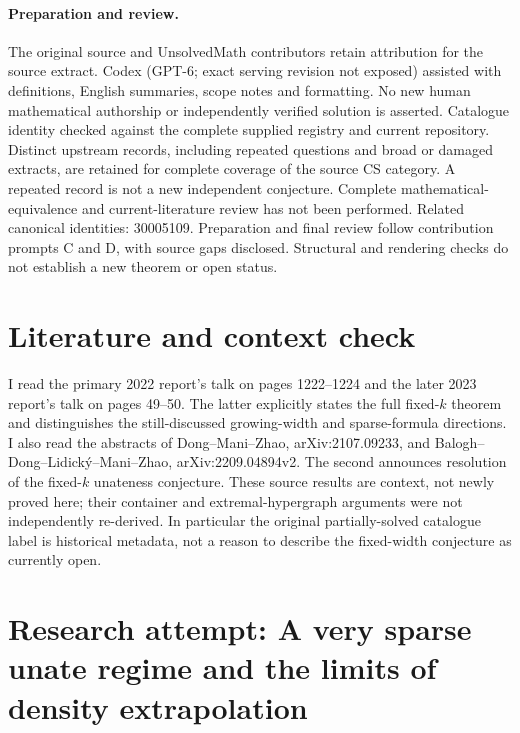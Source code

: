 \documentclass[11pt]{article}
\begin{document}
\paragraph{Preparation and review.}
The original source and UnsolvedMath contributors retain attribution for the source extract. Codex (GPT-6; exact serving revision not exposed) assisted with definitions, English summaries, scope notes and formatting. No new human mathematical authorship or independently verified solution is asserted. Catalogue identity checked against the complete supplied registry and current repository. Distinct upstream records, including repeated questions and broad or damaged extracts, are retained for complete coverage of the source CS category. A repeated record is not a new independent conjecture. Complete mathematical-equivalence and current-literature review has not been performed. Related canonical identities: 30005109. Preparation and final review follow contribution prompts C and D, with source gaps disclosed. Structural and rendering checks do not establish a new theorem or open status.
\label{end:statement}

\section{Literature and context check}

I read the primary 2022 report's talk on pages 1222--1224 and the later 2023
report's talk on pages 49--50. The latter explicitly states the full fixed-$k$
theorem and distinguishes the still-discussed growing-width and sparse-formula
directions. I also read the abstracts of Dong--Mani--Zhao,
arXiv:2107.09233, and Balogh--Dong--Lidick\'y--Mani--Zhao,
arXiv:2209.04894v2. The second announces resolution of the fixed-$k$ unateness
conjecture. These source results are context, not newly proved here; their
container and extremal-hypergraph arguments were not independently re-derived.
In particular the original partially-solved catalogue label is historical metadata,
not a reason to describe the fixed-width conjecture as currently open.

\section{Research attempt: A very sparse unate regime and the limits of density extrapolation}
\end{document}
